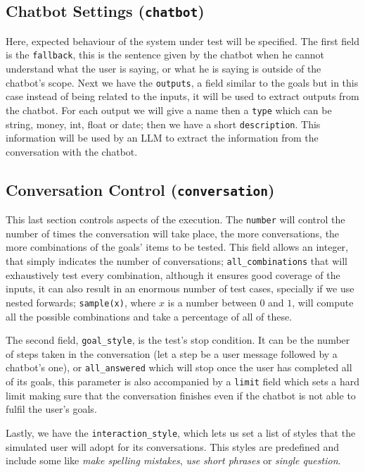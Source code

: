 \subsection{Chatbot Settings (\texttt{chatbot})}

Here, expected behaviour of the system under test will be specified.
The first field is the \texttt{fallback},
this is the sentence given by the chatbot when he cannot understand what the user is saying,
or what he is saying is outside of the chatbot's scope.
Next we have the \texttt{outputs}, a field similar to the goals
but in this case instead of being related to the inputs,
it will be used to extract outputs from the chatbot.
For each output we will give a name
then a \texttt{type} which can be string, money, int, float or date;
then we have a short \texttt{description}.
This information will be used by an \ac{LLM}
to extract the information from the conversation with the chatbot.


\subsection{Conversation Control (\texttt{conversation})}

This last section controls aspects of the execution.
The \texttt{number} will control the number of times the conversation will take place,
the more conversations, the more combinations of the goals' items to be tested.
This field allows an integer, that simply indicates the number of conversations;
\texttt{all\_combinations} that will exhaustively test every combination,
although it ensures good coverage of the inputs,
it can also result in an enormous number of test cases, specially if we use nested forwards;
\texttt{sample(x)}, where $x$ is a number between $0$ and $1$,
will compute all the possible combinations
and take a percentage of all of these.

The second field, \texttt{goal\_style}, is the test's stop condition.
It can be the number of steps taken in the conversation
(let a step be a user message followed by a chatbot's one),
or \texttt{all\_answered} which will stop once the user has completed all of its goals,
this parameter is also accompanied by a \texttt{limit} field which sets a hard limit
making sure that the conversation finishes even if the chatbot is not able to fulfil the user's goals.

Lastly, we have the \texttt{interaction\_style},
which lets us set a list of styles that the simulated user will adopt for its conversations.
This styles are predefined and include some like \textit{make spelling mistakes}, \textit{use short phrases}
or \textit{single question}.

